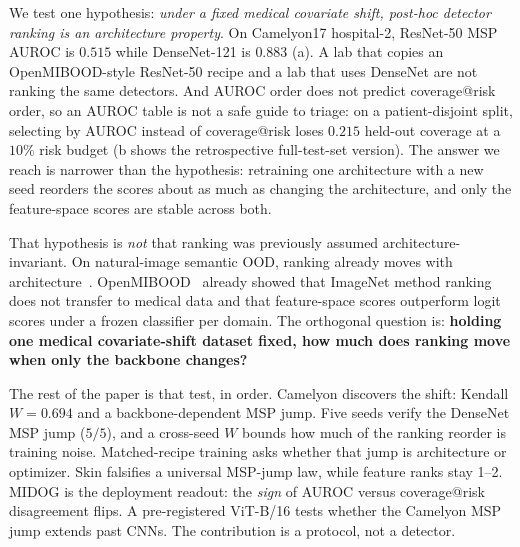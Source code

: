 \documentclass[anon]{midl}
\begin{document}
We test one hypothesis: \emph{under a fixed medical covariate shift, post-hoc detector ranking is an architecture property}.
On Camelyon17 hospital-2, ResNet-50 MSP AUROC is $0.515$ while DenseNet-121 is $0.883$ (a).
A lab that copies an OpenMIBOOD-style ResNet-50 recipe and a lab that uses DenseNet are not ranking the same detectors.
And AUROC order does not predict coverage@risk order, so an AUROC table is not a safe guide to triage: on a patient-disjoint split, selecting by AUROC instead of coverage@risk loses $0.215$ held-out coverage at a $10\%$ risk budget (b shows the retrospective full-test-set version).
The answer we reach is narrower than the hypothesis: retraining one architecture with a new seed reorders the scores about as much as changing the architecture, and only the feature-space scores are stable across both.

That hypothesis is \emph{not} that ranking was previously assumed architecture-invariant.
On natural-image semantic OOD, ranking already moves with architecture~\cite{zhang2023openoodv15,szyc2023uai,datko2026eswa,claros2025arxiv}.
OpenMIBOOD~\cite{openmibood2025} already showed that ImageNet method ranking does not transfer to medical data and that feature-space scores outperform logit scores under a frozen classifier per domain.
The orthogonal question is: \textbf{holding one medical covariate-shift dataset fixed, how much does ranking move when only the backbone changes?}

The rest of the paper is that test, in order.
Camelyon discovers the shift: Kendall $W=0.694$ and a backbone-dependent MSP jump.
Five seeds verify the DenseNet MSP jump ($5/5$), and a cross-seed $W$ bounds how much of the ranking reorder is training noise.
Matched-recipe training asks whether that jump is architecture or optimizer.
Skin falsifies a universal MSP-jump law, while feature ranks stay 1--2.
MIDOG is the deployment readout: the \emph{sign} of AUROC versus coverage@risk disagreement flips.
A pre-registered ViT-B/16 tests whether the Camelyon MSP jump extends past CNNs.
The contribution is a protocol, not a detector.
\end{document}
